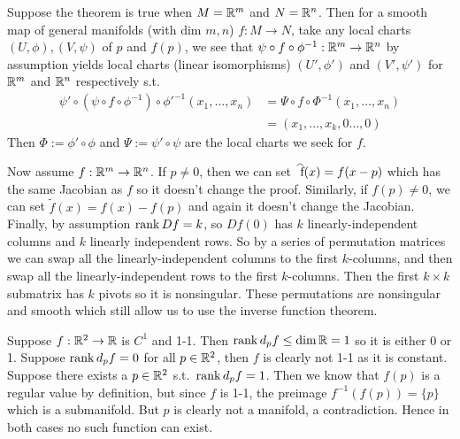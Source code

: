 \documentclass[12pt]{article}
\begin{document}
\begin{problem}[6.12]
Suppose the theorem is true when $ M = \mathbb{R}^{m}$ and $ N = \mathbb{R}^{n}$. Then for a smooth map of general manifolds (with dim $ m,n$) $ f:M \to N$, take any local charts $ (U,\phi),(V,\psi)$ of $ p$ and  $ f(p)$, we see that $ \psi \circ f \circ \phi ^{-1}: \mathbb{R}^{m} \to \mathbb{R}^n$ by assumption yields local charts (linear isomorphisms) $(U', \phi')$ and $ (V', \psi')$ for $ \mathbb{R}^{m}$ and $ \mathbb{R}^{n}$ respectively s.t.\ 
\begin{align*}
	\psi' \circ (\psi \circ f \circ \phi^{-1}) \circ \phi' ^{-1}(x_1,\ldots,x_n) &= \Psi \circ f \circ \Phi^{-1} (x_1,\ldots,x_n)\\
	&= (x_1,\ldots,x_k,0\ldots,0) 
\end{align*}
Then $\Phi := \phi' \circ  \phi$ and $\Psi:= \psi' \circ \psi$ are the local charts we seek for $ f$.

Now assume $ f: \mathbb{R}^{m} \to \mathbb{R}^{n}$. If $ p \neq 0$, then we can set  $ \wh{ f}(x) = f(x-p) $ which has the same Jacobian as $ f$ so it doesn't change the proof. Similarly, if $ f(p) \neq 0$, we can set  $ \widetilde{ f}(x) = f(x) - f(p)$ and again it doesn't change the Jacobian. Finally, by assumption $\operatorname{rank} Df =k$, so  $ Df(0)$ has  $ k$ linearly-independent columns and $ k$ linearly independent rows. So by a series of permutation matrices we can swap all the linearly-independent columns to the first $ k$-columns, and then swap all the linearly-independent rows to the first $ k$-columns. Then the first $ k \times k$ submatrix has $ k$ pivots so it is nonsingular. These permutations are nonsingular and smooth which still allow us to use the inverse function theorem.
\end{problem}

\begin{problem}[6.13]
Suppose $ f: \mathbb{R}^2 \to \mathbb{R}$ is $ C^{1}$ and 1-1. Then $ \operatorname{rank} d_pf \leq \dim \mathbb{R} = 1$ so it is either 0 or 1. Suppose $ \operatorname{rank} d_pf = 0$ for all $ p \in \mathbb{R}^2$, then $ f$ is clearly not 1-1  as it is constant. Suppose there exists a $ p \in \mathbb{R}^2$ s.t.\ $ \operatorname{rank} d_pf = 1$. Then we know that  $ f(p)$ is a regular value by definition, but since  $ f$ is 1-1, the preimage $f^{-1}(f(p)) = \{p\} $ which is a submanifold. But $ p$ is clearly not a manifold, a contradiction. Hence in both cases no such function can exist.
\end{problem}
\end{document}

